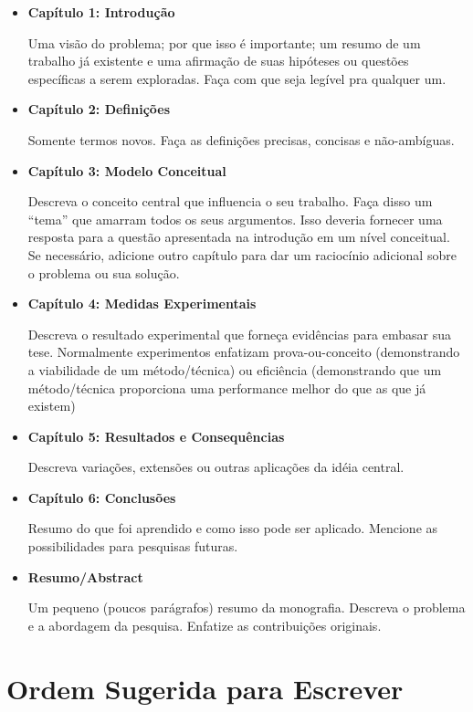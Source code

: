 \begin{itemize}
	
	\item \textbf{Capítulo 1: Introdução}

	Uma visão do problema; por que isso é importante; um resumo de um trabalho já existente e uma afirmação de suas hipóteses ou questões específicas a serem exploradas. Faça com que seja legível pra qualquer um.

	\item \textbf{Capítulo 2: Definições}

	Somente termos novos. Faça as definições precisas, concisas e não-ambíguas.

	\item \textbf{Capítulo 3: Modelo Conceitual}

	Descreva o conceito central que influencia o seu trabalho. Faça disso um ``tema'' que amarram todos os seus argumentos. Isso deveria fornecer uma resposta para a questão apresentada na introdução em um nível conceitual. Se necessário, adicione outro capítulo para dar um raciocínio adicional sobre o problema ou sua solução.

	\item \textbf{Capítulo 4: Medidas Experimentais}

	Descreva o resultado experimental que forneça evidências para embasar sua tese. Normalmente experimentos enfatizam prova-ou-conceito (demonstrando a viabilidade de um método/técnica) ou eficiência (demonstrando que um método/técnica proporciona uma performance melhor do que as que já existem)
	
	\item \textbf{Capítulo 5: Resultados e Consequências}

	Descreva variações, extensões ou outras aplicações da idéia central.

	\item \textbf{Capítulo 6: Conclusões}

	Resumo do que foi aprendido e como isso pode ser aplicado. Mencione as possibilidades para pesquisas futuras.

	\item \textbf{Resumo/Abstract}

	Um pequeno (poucos parágrafos) resumo da monografia. Descreva o problema e a abordagem da pesquisa. Enfatize as contribuições originais.

\end{itemize}

\section{Ordem Sugerida para Escrever}

